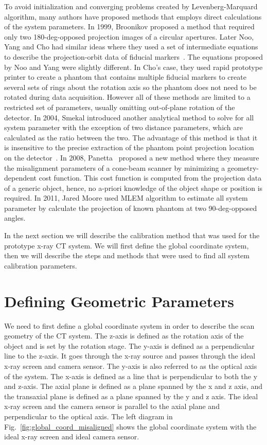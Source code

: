 To avoid initialization and converging problems created by Levenberg-Marquard algorithm, many authors have proposed methods that employs direct calculations of the system parameters.  In 1999, Broonikov proposed a method that required only two 180-deg-opposed projection images of a circular apertures.  Later Noo, Yang and Cho had similar ideas where they used a set of intermediate equations to describe the projection-orbit data of fiducial markers~\citep{Noo2000, Yang2006, Cho2005}.  The equations proposed by Noo and Yang were slightly different.  In Cho's case, they used rapid prototype printer to create a phantom that contains multiple fiducial markers to create several sets of rings about the rotation axis so the phantom does not need to be rotated during data acquisition.  However all of these methods are limited to a restricted set of parameters, usually omitting out-of-plane rotation of the detector.  In 2004, Smekal introduced another analytical method to solve for all system parameter with the exception of two distance parameters, which are calculated as the ratio between the two.  The advantage of this method is that it is insensitive to the precise extraction of the phantom point projection location on the detector~\citep{Smekal2004}.  In 2008, Panetta~\citep{Panetta2008} proposed a new method where they measure the misalignment parameters of a cone-beam scanner by minimizing a geometry-dependent cost function.  This cost function is computed from the projection data of a generic object, hence, no a-priori knowledge of the object shape or position is required.  In 2011, Jared Moore used MLEM algorithm to estimate all system parameter by calculate the projection of known phantom at two 90-deg-opposed angles.

In the next section we will describe the calibration method that was used for the prototype x-ray CT system.  We will first define the global coordinate system, then we will describe the steps and methods that were used to find all system calibration parameters.

\section{Defining Geometric Parameters}
We need to first define a global coordinate system in order to describe the scan geometry of the CT system.  The z-axis is defined as the rotation axis of the object and is set by the rotation stage.  The y-axis is defined as a perpendicular line to the z-axis.  It goes through the x-ray source and passes through the ideal x-ray screen and camera sensor.  The y-axis is also referred to as the optical axis of the system.  The x-axis is defined as a line that is perpendicular to both the y and z-axis.  The axial plane is defined as a plane spanned by the x and z axis, and the transaxial plane is defined as a plane spanned by the y and z axis.  The ideal x-ray screen and the camera sensor is parallel to the axial plane and perpendicular to the optical axis.  The left diagram in Fig.~\ref{fig:global_coord_misaligned} shows the global coordinate system with the ideal x-ray screen and ideal camera sensor.  

